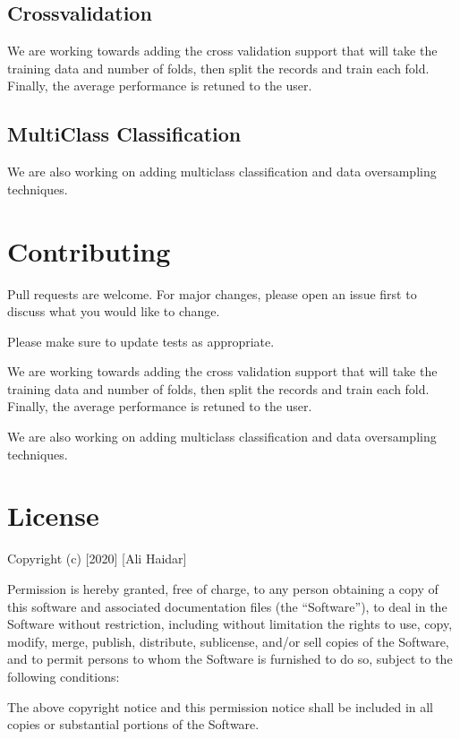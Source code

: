 \documentclass[letterpaper,10pt,english]{sphinxmanual}
\begin{document}
\section{Crossvalidation}
\label{\detokenize{index:crossvalidation}}
We are working towards adding the cross validation support that will take the training data and number of folds, then split the records and train each fold. Finally, the average performance is retuned to the user.


\section{Multi\sphinxhyphen{}Class Classification}
\label{\detokenize{index:multi-class-classification}}
We are also working on adding multi\sphinxhyphen{}class classification and data oversampling techniques.


\chapter{Contributing}
\label{\detokenize{index:contributing}}
Pull requests are welcome. For major changes, please open an issue first
to discuss what you would like to change.

Please make sure to update tests as appropriate.

We are working towards adding the cross validation support that will take the training data and number of folds, then split the records and train each fold. Finally, the average performance is retuned to the user.

We are also working on adding multi\sphinxhyphen{}class classification and data oversampling techniques.


\chapter{License}
\label{\detokenize{index:license}}
Copyright (c) {[}2020{]} {[}Ali Haidar{]}

Permission is hereby granted, free of charge, to any person obtaining a copy
of this software and associated documentation files (the “Software”), to deal
in the Software without restriction, including without limitation the rights
to use, copy, modify, merge, publish, distribute, sublicense, and/or sell
copies of the Software, and to permit persons to whom the Software is
furnished to do so, subject to the following conditions:

The above copyright notice and this permission notice shall be included in all
copies or substantial portions of the Software.
\end{document}
